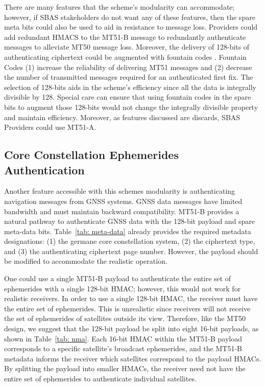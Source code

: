 \documentclass[letterpaper,times]{IONconf/IONconf}
\begin{document}
		There are many features that the scheme's modularity can accommodate; however, if SBAS stakeholders do not want any of these features, then the spare meta bits could also be used to aid in resistance to message loss.
		Providers could add redundant HMACS to the MT51-B message to redundantly authenticate messages to alleviate MT50 message loss.
		Moreover, the delivery of 128-bits of authenticating ciphertext could be augmented with fountain codes \cite{gnss_fountain_codes}.
		Fountain Codes (1) increase the reliability of delivering MT51 messages and (2) decrease the number of transmitted messages required for an authenticated first fix.
		The selection of 128-bits aids in the scheme's efficiency since all the data is integrally divisible by 128.
		Special care can ensure that using fountain codes in the spare bits to augment those 128-bits would not change the integrally divisible property and maintain efficiency.
		Moreover, as features discussed are discards, SBAS Providers could use MT51-A.

	\subsection{Core Constellation Ephemerides Authentication} \label{sub:core_eph}

		Another feature accessible with this schemes modularity is authenticating navigation messages from GNSS systems.
		GNSS data messages have limited bandwidth and must maintain backward compatibility.
		MT51-B provides a natural pathway to authenticate GNSS data with the 128-bit payload and spare meta-data bits.
		Table~\ref{tab: meta-data} already provides the required metadata designations: (1) the germane core constellation system, (2) the ciphertext type, and (3) the authenticating ciphertext page number.
		However, the payload should be modified to accommodate the realistic operation.

		One could use a single MT51-B payload to authenticate the entire set of ephemerides with a single 128-bit HMAC; however, this would not work for realistic receivers.
		In order to use a single 128-bit HMAC, the receiver must have the entire set of ephemerides.
		This is unrealistic since receivers will not receive the set of ephemerides of satellites outside its view.
		Therefore, like the MT50 design, we suggest that the 128-bit payload be split into eight 16-bit payloads, as shown in Table~\ref{tab: nma}.
		Each 16-bit HMAC within the MT51-B payload corresponds to a specific satellite's broadcast ephemerides, and the MT51-B metadata informs the receiver which satellites correspond to the payload HMACs.
		By splitting the payload into smaller HMACs, the receiver need not have the entire set of ephemerides to authenticate individual satellites.
\end{document}
